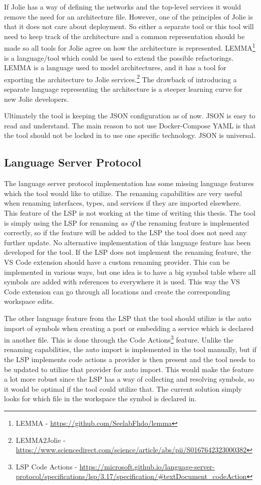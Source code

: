 If Jolie has a way of defining the networks and the top-level services it would remove the need for an architecture file.
However, one of the principles of Jolie is that it does not care about deployment.
So either a separate tool or this tool will need to keep track of the architecture and a common representation should be made so all tools for Jolie agree on how the architecture is represented.
LEMMA\footnote{LEMMA - \url{https://github.com/SeelabFhdo/lemma}} is a language/tool which could be used to extend the possible refactorings. LEMMA is a language used to model architectures, and it has a tool for exporting the architecture to Jolie services.\footnote{LEMMA2Jolie - \url{https://www.sciencedirect.com/science/article/abs/pii/S0167642323000382}} The drawback
of introducing a separate language representing the architecture is a steeper learning curve for new Jolie developers.

Ultimately the tool is keeping the JSON configuration as of now. JSON is easy to read and understand. The main reason to not use Docker-Compose YAML is that the tool should not be locked in to use one specific technology. JSON is universal.

\subsection{Language Server Protocol}
The language server protocol implementation has some missing language features which the tool would like to utilize.
The renaming capabilities are very useful when renaming interfaces, types, and services if they are imported elsewhere. This feature of the LSP is not working at the time of writing this thesis.
The tool is simply using the LSP for renaming \textit{as if} the renaming feature is implemented correctly, so if the feature will be added to the LSP the tool does not need any further update.
No alternative implementation of this language feature has been developed for the tool. If the LSP does not implement the renaming feature, the VS Code extension should have a custom renaming provider.
This can be implemented in various ways, but one idea is to have a big symbol table where all symbols are added with references to everywhere it is used. This way the VS Code extension can go through all locations and create the corresponding workspace edits.

The other language feature from the LSP that the tool should utilize is the auto import of symbols when creating a port or embedding a service which is declared in another file.
This is done through the Code Actions\footnote{LSP Code Actions - \url{https://microsoft.github.io/language-server-protocol/specifications/lsp/3.17/specification/\#textDocument_codeAction}}
feature. Unlike the renaming capabilities, the auto import is implemented in the tool manually, but if the LSP implements code actions a provider is then present and the tool needs to be updated to utilize that provider for auto import.
This would make the feature a lot more robust since the LSP has a way of collecting and resolving symbols, so it would be optimal if the tool could utilize that. The current solution simply looks for which file in the workspace the symbol is declared in.

